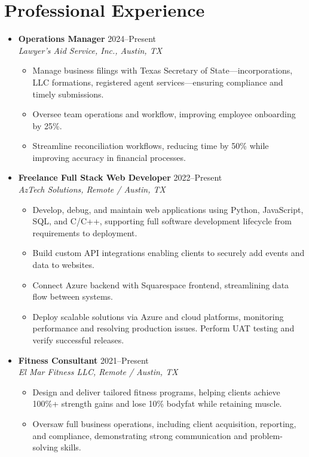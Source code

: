 \documentclass[letterpaper,10pt]{article}
\newcommand{\resumeItem}[1]{\item \small{#1}}
\begin{document}
\section*{Professional Experience}
\begin{itemize}
  \item[]
    \textbf{Operations Manager} \hfill 2024--Present \\
    \textit{Lawyer's Aid Service, Inc., Austin, TX}
  \begin{itemize}
    \resumeItem{Manage business filings with Texas Secretary of State---incorporations, LLC formations, registered agent services---ensuring compliance and timely submissions.}
    \resumeItem{Oversee team operations and workflow, improving employee onboarding by 25\%.}
    \resumeItem{Streamline reconciliation workflows, reducing time by 50\% while improving accuracy in financial processes.}
  \end{itemize}

  \item[]
    \textbf{Freelance Full Stack Web Developer} \hfill 2022--Present \\
    \textit{AzTech Solutions, Remote / Austin, TX}
  \begin{itemize}
    \resumeItem{Develop, debug, and maintain web applications using Python, JavaScript, SQL, and C/C++, supporting full software development lifecycle from requirements to deployment.}
    \resumeItem{Build custom API integrations enabling clients to securely add events and data to websites.}
    \resumeItem{Connect Azure backend with Squarespace frontend, streamlining data flow between systems.}
    \resumeItem{Deploy scalable solutions via Azure and cloud platforms, monitoring performance and resolving production issues. Perform UAT testing and verify successful releases.}
  \end{itemize}

  \item[]
    \textbf{Fitness Consultant} \hfill 2021--Present \\
    \textit{El Mar Fitness LLC, Remote / Austin, TX}
  \begin{itemize}
    \resumeItem{Design and deliver tailored fitness programs, helping clients achieve 100\%+ strength gains and lose 10\% bodyfat while retaining muscle.}
    \resumeItem{Oversaw full business operations, including client acquisition, reporting, and compliance, demonstrating strong communication and problem-solving skills.}
  \end{itemize}
\end{itemize}
\end{document}
